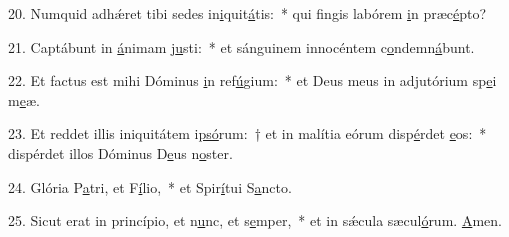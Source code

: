 20. Numquid adhǽret tibi sedes in\uline{i}quit\uline{á}tis:~* qui fingis labórem \uline{i}n præc\uline{é}pto?\par 
21. Captábunt in \uline{á}nimam j\uline{u}sti:~* et sánguinem innocéntem c\uline{o}ndemn\uline{á}bunt.\par 
22. Et factus est mihi Dóminus \uline{i}n ref\uline{ú}gium:~* et Deus meus in adjutórium sp\uline{e}i m\uline{e}æ.\par 
23. Et reddet illis iniquitátem i\uline{psó}rum:~† et in malítia eórum disp\uline{é}rdet \uline{e}os:~* dispérdet illos Dóminus D\uline{e}us n\uline{o}ster.\par 
24. Glória P\uline{a}tri, et F\uline{í}lio,~* et Spir\uline{í}tui S\uline{a}ncto.\par 
25. Sicut erat in princípio, et n\uline{u}nc, et s\uline{e}mper,~* et in sǽcula sæcul\uline{ó}rum. \uline{A}men.\par 
